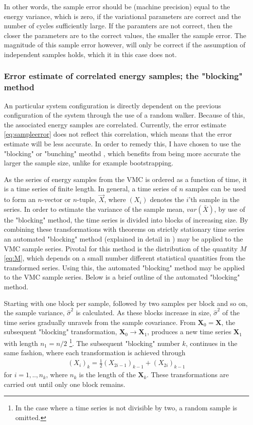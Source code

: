 \documentclass[%
oneside,                 %
final,                   %
10pt]{article}
\begin{document}
In other words, the sample error should be (machine precision) equal to the energy variance, which is zero, if the variational parameters are correct and the number of cycles sufficiently large. If the paramters are not correct, then the closer the parameters are to the correct values, the smaller the sample error. The magnitude of this sample error however, will only be correct if the assumption of independent samples holds, which it in this case does not.

\subsubsection{Error estimate of correlated energy samples; the "blocking" method} 
An particular system configuration is directly dependent on the previous configuration of the system through the use of a random walker. Because of this, the associated energy samples are correlated. Currently, the error estimate \eqref{eq:sampleerror} does not reflect this correlation, which means that the error estimate will be less accurate. In order to remedy this, I have chosen to use the "blocking" or "bunching" meothd \cite {flyvebjerg}, which benefits from being more accurate the larger the sample size, unlike for example bootstrapping.


As the series of energy samples from the VMC is ordered as a function of time, it is a time series of finite length. In general, a time series of $n$ samples can be used to form an $n$-vector or $n$-tuple, $\vec X$, where $(X_i)$ denotes the $i$'th sample in the series. In order to estimate the variance of the sample mean, $var (\bar X)$, by use of  the "blocking" method, the time series is divided into blocks of increasing size. By combining these transformations with theorems on strictly stationary time series an automated "blocking" method (explained in detail in \cite{Jonsson}) may be applied to the VMC sample series. Pivotal for this method is the distribution of the quantity $M$ \eqref{eq:M}, which depends on a small number different statistical quantities from the transformed series. Using this, the automated "blocking" method may be applied to the VMC sample series. Below is a brief outline of the automated "blocking" method.

Starting with one block per sample, followed by two samples per block and so on, the sample variance, $\hat \sigma^2$ is calculated. As these blocks increase in size, $\hat \sigma^2$ of the time series gradually unravels from the sample covariance. From $\bm X_0=\bm X$, the subsequent "blocking" transformation, $\bm X_0 \rightarrow \bm X_1$, produces a new time series $\bm X_1$ with length $n_1=n/2$ \footnote{In the case where a time series is not divisible by two, a random sample is omitted.}. The subsequent "blocking" number $k$, continues in the same fashion, where each transformation is achieved through 
\begin{align}
(X_i)_k=\frac{1}{2} (X_{2i-1})_{k-1} + (X_{2i})_{k-1}
\end{align}
for $i=1,..,n_k$, where $n_k$ is the length of the $\bm X_k$. These transformations are carried out until only one block remains. 
\end{document}
